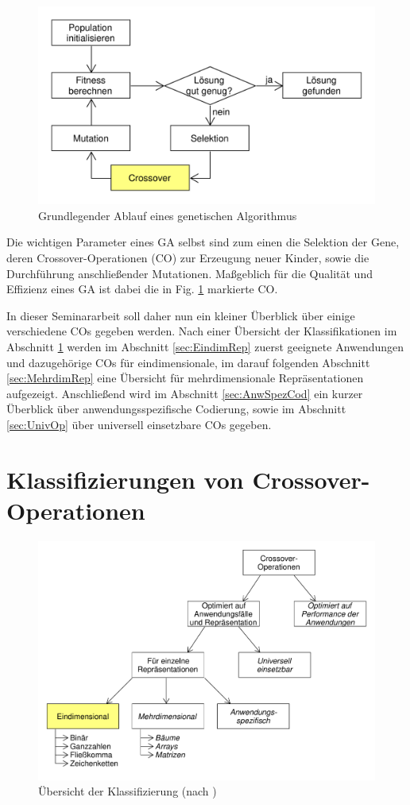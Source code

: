 \documentclass{llncs}
\begin{document}
\begin{figure}
	\centering
	\includegraphics[width=.8\columnwidth]{./Figures/GA-Prinzip.pdf}
	\caption{Grundlegender Ablauf eines genetischen Algorithmus}
	\label{fig:abb1}
\end{figure}	

Die wichtigen Parameter eines GA selbst sind zum einen die Selektion der Gene, deren Crossover-Operationen (CO) zur Erzeugung neuer Kinder, sowie die Durch\-füh\-rung anschließender Mutationen. Maßgeblich für die Qualität und Effizienz eines GA ist dabei die in Fig. \ref{fig:abb1} markierte CO.

In dieser Seminararbeit soll daher nun ein kleiner Überblick über einige verschiedene COs gegeben werden. Nach einer Übersicht der Klassifikationen im Abschnitt \ref{sec:KlassCO} werden im Abschnitt \ref{sec:EindimRep} zuerst geeignete Anwendungen und dazugehörige COs für eindimensionale, im darauf folgenden Abschnitt \ref{sec:MehrdimRep} eine Übersicht für mehrdimensionale Repräsentationen aufgezeigt. Anschließend wird im Abschnitt \ref{sec:AnwSpezCod} ein kurzer Überblick über anwendungsspezifische Codierung, sowie im Abschnitt \ref{sec:UnivOp} über universell einsetzbare COs gegeben.

\section{Klassifizierungen von Crossover-Operationen}
\label{sec:KlassCO}

\begin{figure}
	\centering
	\includegraphics[width=.8\columnwidth]{./Figures/Crossover-Klassifizierung.pdf}
	\caption{Übersicht der Klassifizierung (nach \cite{Survey})}
	\label{fig:abb2}
\end{figure}
\end{document}
